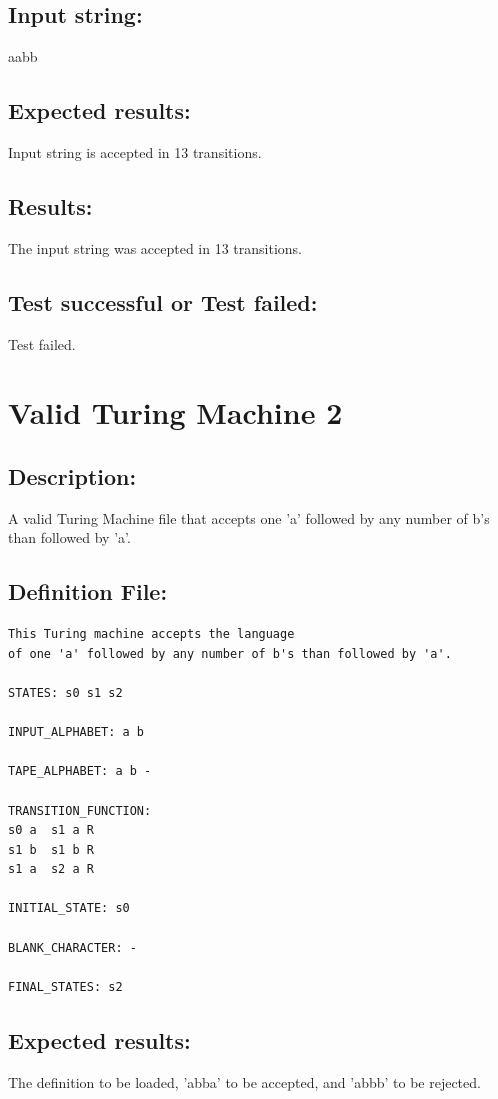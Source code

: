 \documentclass{report}
\begin{document}
\section{Input string:} aabb
\section{Expected results:} Input string is accepted in 13 transitions.
\section{Results:} The input string was accepted in 13 transitions.
\section{Test successful or Test failed:} Test failed.

\pagebreak


\chapter{Valid Turing Machine 2}
     
\section{Description:} A valid Turing Machine file that accepts one 'a' followed by any number of b's than followed by 'a'.

\section{Definition File: }
\begin{verbatim}
This Turing machine accepts the language 
of one 'a' followed by any number of b's than followed by 'a'.

STATES: s0 s1 s2
	
INPUT_ALPHABET: a b

TAPE_ALPHABET: a b -

TRANSITION_FUNCTION:
s0 a  s1 a R
s1 b  s1 b R
s1 a  s2 a R

INITIAL_STATE: s0

BLANK_CHARACTER: -

FINAL_STATES: s2
\end{verbatim}
\section{Expected results:} The definition to be loaded, 'abba' to be accepted, and 'abbb' to be rejected.
\end{document}
